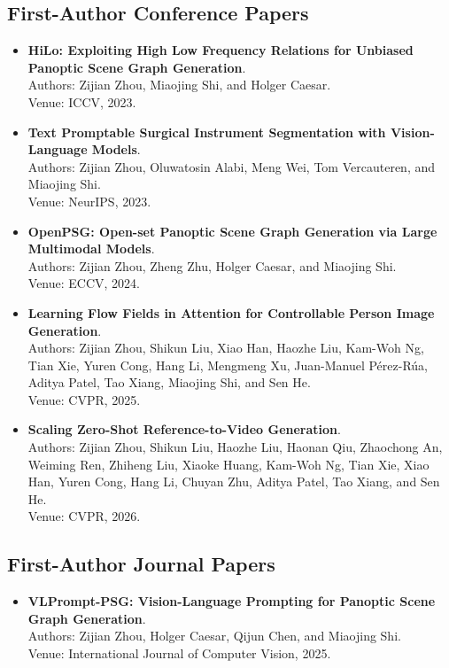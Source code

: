 \subsection{First-Author Conference Papers}
\begin{itemize}
    \item \textbf{HiLo: Exploiting High Low Frequency Relations for Unbiased Panoptic Scene Graph Generation}.\\
    Authors: Zijian Zhou, Miaojing Shi, and Holger Caesar.\\
    Venue: ICCV, 2023.~\citep{zhou2023hilo}
    \item \textbf{Text Promptable Surgical Instrument Segmentation with Vision-Language Models}.\\
    Authors: Zijian Zhou, Oluwatosin Alabi, Meng Wei, Tom Vercauteren, and Miaojing Shi.\\
    Venue: NeurIPS, 2023.~\citep{zhou2023text}
    \item \textbf{OpenPSG: Open-set Panoptic Scene Graph Generation via Large Multimodal Models}.\\
    Authors: Zijian Zhou, Zheng Zhu, Holger Caesar, and Miaojing Shi.\\
    Venue: ECCV, 2024.~\citep{zhou2025openpsg}
    \item \textbf{Learning Flow Fields in Attention for Controllable Person Image Generation}.\\
    Authors: Zijian Zhou, Shikun Liu, Xiao Han, Haozhe Liu, Kam-Woh Ng, Tian Xie, Yuren Cong, Hang Li, Mengmeng Xu, Juan-Manuel Pérez-Rúa, Aditya Patel, Tao Xiang, Miaojing Shi, and Sen He.\\
    Venue: CVPR, 2025.~\citep{zhou2025learning}
    \item \textbf{Scaling Zero-Shot Reference-to-Video Generation}.\\
    Authors: Zijian Zhou, Shikun Liu, Haozhe Liu, Haonan Qiu, Zhaochong An, Weiming Ren, Zhiheng Liu, Xiaoke Huang, Kam-Woh Ng, Tian Xie, Xiao Han, Yuren Cong, Hang Li, Chuyan Zhu, Aditya Patel, Tao Xiang, and Sen He.\\
    Venue: CVPR, 2026.~\citep{zhou2025scaling}
\end{itemize}

\subsection{First-Author Journal Papers}
\begin{itemize}
    \item \textbf{VLPrompt-PSG: Vision-Language Prompting for Panoptic Scene Graph Generation}.\\
    Authors: Zijian Zhou, Holger Caesar, Qijun Chen, and Miaojing Shi.\\
    Venue: International Journal of Computer Vision, 2025.~\citep{zhou2025vlprompt}
\end{itemize}

